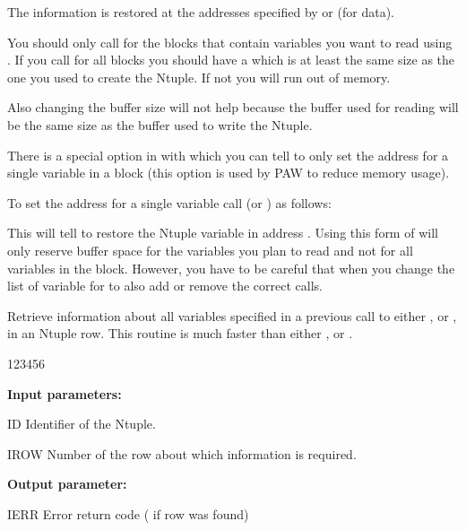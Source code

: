 The information is restored at the addresses specified by 
or  (for  data).

\begin{changebar}
You should only call  for the blocks that 
contain variables you want to read using . 
If you call  for all blocks you should
have a  which is at least the same size as the one you used to
create the Ntuple. 
If not you will run out of memory.

Also changing the buffer size will not help because the buffer used for
reading will be the same size as the buffer used to write the Ntuple.

There is a special option in  with which you can tell
 to only set the address 
for a single variable in a block (this option
is used by PAW to reduce memory usage). 

To set the address for a single variable call 
 (or ) as follows:
This will tell  to restore the Ntuple 
variable  in address . 
Using this form of  will only reserve buffer space for
the variables you plan to read and not for all variables in the block.
However, you have to be careful that when you change the list 
of variable for
 to also add or remove the correct  calls.
\end{changebar}

 
\Action

Retrieve information about all variables specified in a previous
call to either ,  or , in an Ntuple row.
This routine is much faster than either ,  or
.
 
\begin{DLtt}{123456}
\item[{\rm\bf Input parameters:}]
\item[ID] Identifier of the Ntuple.
\item[IROW] Number of the row about which information is required.
\item[{\rm\bf Output parameter:}]
\item[IERR] Error return code ( if row was found)
\end{DLtt}

